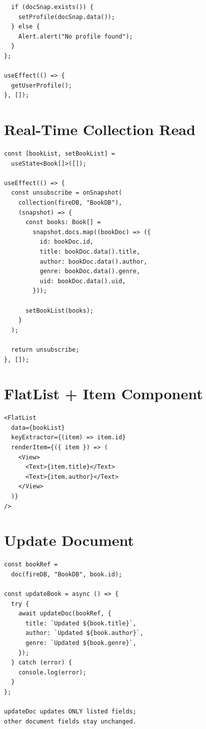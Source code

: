 \documentclass[8pt,a4paper]{extarticle}
\begin{document}
\begin{multicols}{3}
\begin{lstlisting}
  if (docSnap.exists()) {
    setProfile(docSnap.data());
  } else {
    Alert.alert("No profile found");
  }
};

useEffect(() => {
  getUserProfile();
}, []);
\end{lstlisting}

\section*{Real-Time Collection Read}
\begin{lstlisting}
const [bookList, setBookList] =
  useState<Book[]>([]);

useEffect(() => {
  const unsubscribe = onSnapshot(
    collection(fireDB, "BookDB"),
    (snapshot) => {
      const books: Book[] =
        snapshot.docs.map((bookDoc) => ({
          id: bookDoc.id,
          title: bookDoc.data().title,
          author: bookDoc.data().author,
          genre: bookDoc.data().genre,
          uid: bookDoc.data().uid,
        }));

      setBookList(books);
    }
  );

  return unsubscribe;
}, []);
\end{lstlisting}

\section*{FlatList + Item Component}
\begin{lstlisting}
<FlatList
  data={bookList}
  keyExtractor={(item) => item.id}
  renderItem={({ item }) => (
    <View>
      <Text>{item.title}</Text>
      <Text>{item.author}</Text>
    </View>
  )}
/>
\end{lstlisting}

\section*{Update Document}
\begin{lstlisting}
const bookRef =
  doc(fireDB, "BookDB", book.id);

const updateBook = async () => {
  try {
    await updateDoc(bookRef, {
      title: `Updated ${book.title}`,
      author: `Updated ${book.author}`,
      genre: `Updated ${book.genre}`,
    });
  } catch (error) {
    console.log(error);
  }
};

updateDoc updates ONLY listed fields;
other document fields stay unchanged.
\end{lstlisting}


\end{multicols}
\end{document}
